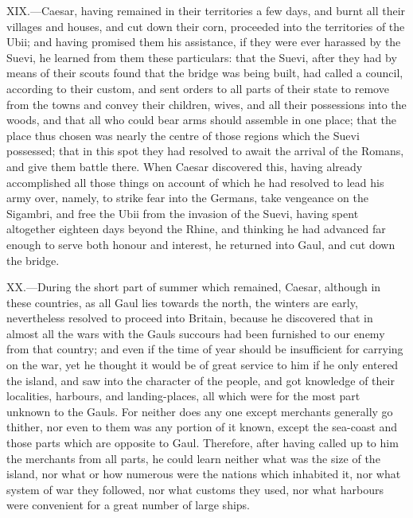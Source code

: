 XIX.—Caesar, having remained in their territories a few days, and burnt
all their villages and houses, and cut down their corn, proceeded into
the territories of the Ubii; and having promised them his assistance, if
they were ever harassed by the Suevi, he learned from them these
particulars: that the Suevi, after they had by means of their scouts
found that the bridge was being built, had called a council, according
to their custom, and sent orders to all parts of their state to remove
from the towns and convey their children, wives, and all their
possessions into the woods, and that all who could bear arms should
assemble in one place; that the place thus chosen was nearly the centre
of those regions which the Suevi possessed; that in this spot they had
resolved to await the arrival of the Romans, and give them battle there.
When Caesar discovered this, having already accomplished all those
things on account of which he had resolved to lead his army over,
namely, to strike fear into the Germans, take vengeance on the Sigambri,
and free the Ubii from the invasion of the Suevi, having spent
altogether eighteen days beyond the Rhine, and thinking he had advanced
far enough to serve both honour and interest, he returned into Gaul, and
cut down the bridge.

XX.—During the short part of summer which remained, Caesar, although in
these countries, as all Gaul lies towards the north, the winters are
early, nevertheless resolved to proceed into Britain, because he
discovered that in almost all the wars with the Gauls succours had been
furnished to our enemy from that country; and even if the time of year
should be insufficient for carrying on the war, yet he thought it would
be of great service to him if he only entered the island, and saw into
the character of the people, and got knowledge of their localities,
harbours, and landing-places, all which were for the most part unknown
to the Gauls. For neither does any one except merchants generally go
thither, nor even to them was any portion of it known, except the
sea-coast and those parts which are opposite to Gaul. Therefore, after
having called up to him the merchants from all parts, he could learn
neither what was the size of the island, nor what or how numerous were
the nations which inhabited it, nor what system of war they followed,
nor what customs they used, nor what harbours were convenient for a
great number of large ships.


